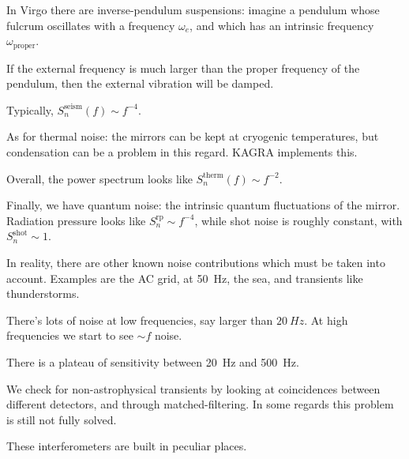 \documentclass[main.tex]{subfiles}
\begin{document}
In Virgo there are inverse-pendulum suspensions: imagine a pendulum whose fulcrum oscillates with a frequency \(\omega_e \), and which has an intrinsic frequency \(\omega _{\text{proper}}\). 

If the external frequency is much larger than the proper frequency of the pendulum, then the external vibration will be damped. 

Typically, \(S_n^{\text{seism}} (f) \sim f^{-4}\). 

As for thermal noise: the mirrors can be kept at cryogenic temperatures, but condensation can be a problem in this regard. KAGRA implements this. 

Overall, the power spectrum looks like \(S_n^{\text{therm}}(f) \sim f^{-2}\). 

Finally, we have quantum noise: the intrinsic quantum fluctuations of the mirror. 
Radiation pressure looks like \(S_n^{\text{rp}} \sim f^{-4}\), while shot noise is roughly constant, with \(S_n^{\text{shot}} \sim 1\). 

In reality, there are other known noise contributions which must be taken into account. 
Examples are the AC grid, at \SI{50}{Hz}, the sea, and transients like thunderstorms. 

There's lots of noise at low frequencies, say larger than \(\SI{20}{Hz}\). 
At high frequencies we start to see \(\sim f\) noise. 

There is a plateau of sensitivity between \SI{20}{Hz} and \SI{500}{Hz}. 

We check for non-astrophysical transients by looking at coincidences between different detectors, and through matched-filtering. 
In some regards this problem is still not fully solved. 

These interferometers are built in peculiar places. 
\end{document}
